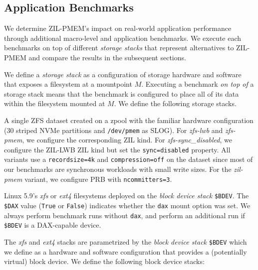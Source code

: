 \documentclass[12pt,a4paper,twoside]{book}
\begin{document}
\subsection{Application Benchmarks}
We determine ZIL-PMEM's impact on real-world application performance through additional macro-level and application benchmarks.
We execute each benchmarks on top of different \textit{storage stacks} that represent alternatives to ZIL-PMEM and compare the results in the subsequent sections.

We define a \textit{storage stack} as a configuration of storage hardware and software that exposes a filesystem at a mountpoint $M$.
Executing a benchmark \textit{on top of} a storage stack means that the benchmark is configured to place all of its data within the filesystem mounted at $M$.
We define the following storage stacks.
\begin{description}[noitemsep,leftmargin=1.5cm,labelindent=1cm]
    \item[zfs-\{lwb,pmem,sync\_disabled\}] A single ZFS dataset created on a zpool with the familiar hardware configuration (30 striped NVMe partitions and \texttt{/dev/pmem} as SLOG).
        For \textit{zfs-lwb} and \textit{zfs-pmem}, we configure the corresponding ZIL kind.
        For \textit{zfs-sync\_disabled}, we configure the ZIL-LWB ZIL kind but set the \lstinline{sync=disabled} property.
        All variants use a \lstinline{recordsize=4k} and \lstinline{compression=off} on the dataset since most of our benchmarks are synchronous workloads with small write sizes.
        For the \textit{zil-pmem} variant, we configure PRB with \lstinline{ncommitters=3}.
    \item[\{xfs,ext4\}\_\_on\_\_\$BDEV\_\_dax\_\$DAX] Linux 5.9's \textit{xfs} or \textit{ext4} filesystems deployed on the \textit{block device stack} \lstinline{$BDEV}.
        The \lstinline{$DAX} value (\lstinline{True} or \lstinline{False}) indicates whether the \lstinline{dax} mount option was set.
        We always perform benchmark runs without \lstinline{dax}, and perform an additional run if \lstinline{$BDEV} is a DAX-capable device.
\end{description}
The \textit{xfs} and \textit{ext4} stacks are parametrized by the \textit{block device stack} \lstinline{$BDEV} which we define as a hardware and software configuration that provides a (potentially virtual) block device.
We define the following block device stacks:
\end{document}
